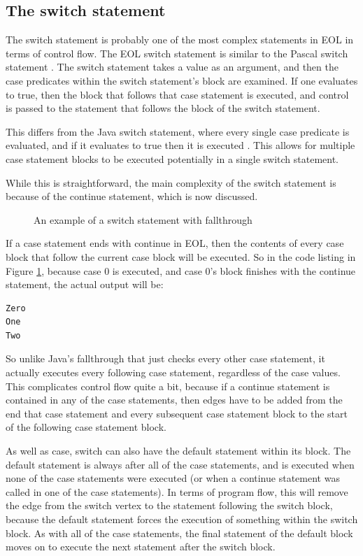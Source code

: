 \subsection{The switch statement}

The switch statement is probably one of the most complex statements in EOL in terms of control flow. The EOL switch statement is similar to the Pascal switch statement \citep{pascalSwitch}. The switch statement takes a value as an argument, and then the case predicates within the switch statement's block are examined. If one evaluates to true, then the block that follows that case statement is executed, and control is passed to the statement that follows the block of the switch statement.

This differs from the Java switch statement, where every single case predicate is evaluated, and if it evaluates to true then it is executed \citep{pascalSwitch}. This allows for multiple case statement blocks to be executed potentially in a single switch statement.

While this is straightforward, the main complexity of the switch statement is because of the continue statement, which is now discussed.

\begin{figure}[h]

\caption{An example of a switch statement with fallthrough}
\label{lst:switchFallthrough}
\end{figure}

If a case statement ends with continue in EOL, then the contents of every case block that follow the current case block will be executed. So in the code listing in Figure \ref{lst:switchFallthrough}, because case 0 is executed, and case 0's block finishes with the continue statement, the actual output will be:

\begin{verbatim}
Zero
One
Two
\end{verbatim}

So unlike Java's fallthrough that just checks every other case statement, it actually executes every following case statement, regardless of the case values. This complicates control flow quite a bit, because if a continue statement is contained in any of the case statements, then edges have to be added from the end that case statement and every subsequent case statement block to the start of the following case statement block.

As well as case, switch can also have the default statement within its block. The default statement is always after all of the case statements, and is executed when none of the case statements were executed (or when a continue statement was called in one of the case statements). In terms of program flow, this will remove the edge from the switch vertex to the statement following the switch block, because the default statement forces the execution of something within the switch block. As with all of the case statements, the final statement of the default block moves on to execute the next statement after the switch block.

